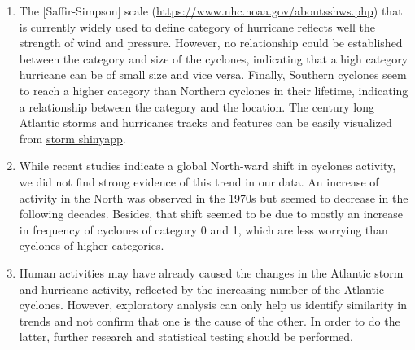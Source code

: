 \documentclass[]{book}
\begin{document}
\begin{enumerate}
\def\labelenumi{(\arabic{enumi})}
\item
  The {[}Saffir-Simpson{]} scale (\url{https://www.nhc.noaa.gov/aboutsshws.php}) that is currently widely used to define category of hurricane reflects well the strength of wind and pressure. However, no relationship could be established between the category and size of the cyclones, indicating that a high category hurricane can be of small size and vice versa. Finally, Southern cyclones seem to reach a higher category than Northern cyclones in their lifetime, indicating a relationship between the category and the location. The century long Atlantic storms and hurricanes tracks and features can be easily visualized from \href{https://hurricane.shinyapps.io/01_01/}{storm shinyapp}.
\item
  While recent studies indicate a global North-ward shift in cyclones activity, we did not find strong evidence of this trend in our data. An increase of activity in the North was observed in the 1970s but seemed to decrease in the following decades. Besides, that shift seemed to be due to mostly an increase in frequency of cyclones of category 0 and 1, which are less worrying than cyclones of higher categories.
\item
  Human activities may have already caused the changes in the Atlantic storm and hurricane activity, reflected by the increasing number of the Atlantic cyclones. However, exploratory analysis can only help us identify similarity in trends and not confirm that one is the cause of the other. In order to do the latter, further research and statistical testing should be performed.
\end{enumerate}


\end{document}
